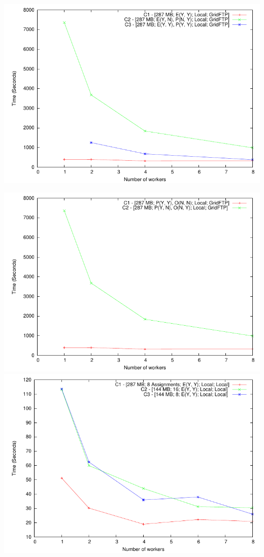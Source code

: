 \documentclass{rspublic}
\begin{document}
\includegraphics{data/graphs/ConventionalFigure}

\includegraphics{data/graphs/IntelligentExtremes}
\includegraphics{data/graphs/LocalFigure}
\end{document}

